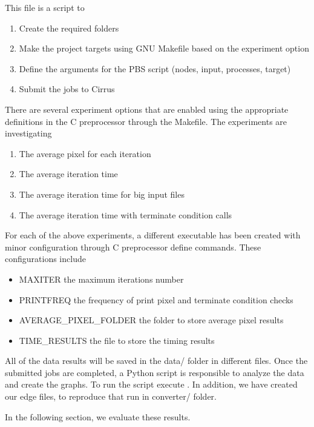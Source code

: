 \documentclass[12pt,a4paper]{article}
\begin{document}
	 This file is a script to
	\begin{enumerate}
    \item Create the required folders
    \item Make the project targets using GNU Makefile based on the experiment option
    \item Define the arguments for the PBS script (nodes, input, processes, target)
    \item Submit the jobs to Cirrus
	\end{enumerate}
	
  There are several experiment options that are enabled using the appropriate definitions in the C preprocessor through the Makefile. The experiments are investigating
  \begin{enumerate}
    \item The average pixel for each iteration
    \item The average iteration time
    \item The average iteration time for big input files
    \item The average iteration time with terminate condition calls
  \end{enumerate}

	 For each of the above experiments, a different executable has been created with minor configuration through C preprocessor define commands. These configurations include 
	
	\begin{itemize}
		\item MAXITER the maximum iterations number
		\item PRINTFREQ the frequency of print pixel and terminate condition checks
		\item AVERAGE\_PIXEL\_FOLDER the folder to store average pixel results
		\item TIME\_RESULTS the file to store the timing results
	\end{itemize}

	All of the data results will be saved in the data/ folder in different files. Once the submitted jobs are completed, a Python script is responsible to analyze the data and create the graphs. To run the script execute . In addition, we have created our edge files, to reproduce that run  in converter/ folder.
	
  	In the following section, we evaluate these results.
  
\end{document}
